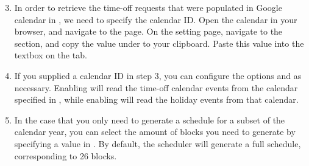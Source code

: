 \documentclass[letterpaper,10pt,english]{sphinxmanual}
\begin{document}
\begin{figure}[h!]
\centering
{}\end{figure}
\begin{enumerate}
\setcounter{enumi}{2}
\item {} 
 In order to retrieve the time-off requests that were populated
in Google calendar in {\hyperref[\detokenize{index:adding-clinician-requests}]{}}, we need to specify the
calendar ID. Open the calendar in your browser, and navigate to the
 page.
On the setting page, navigate to the  section, and copy
the value under  to your clipboard.
Paste this value into the  textbox on the 
tab.

\end{enumerate}

\begin{figure}[h!]
\centering
{}\end{figure}
\begin{enumerate}
\setcounter{enumi}{3}
\item {} 
 If you supplied a calendar ID in step 3, you can configure
the options  and  as necessary.
Enabling  will read the time-off calendar events
from the calendar specified in , while enabling
 will read the holiday events from that calendar.

\end{enumerate}

\begin{figure}[h!]
\centering
{}\end{figure}
\begin{enumerate}
\setcounter{enumi}{4}
\item {} 
 In the case that you only need to generate a schedule for
a subset of the calendar year, you can select the amount of blocks you need
to generate by specifying a value in . By default, the
scheduler will generate a full schedule, corresponding to 26 blocks.

\end{enumerate}
\end{document}
